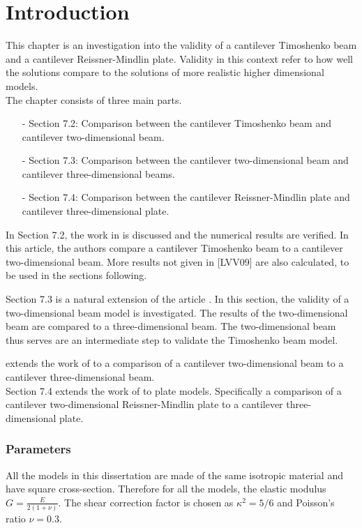 \documentclass[../../main.tex]{subfiles}
\begin{document}
\section{Introduction}
This chapter is an investigation into the validity of a cantilever Timoshenko beam and a cantilever Reissner-Mindlin plate. Validity in this context refer to how well the solutions compare to the solutions of more realistic higher dimensional models.\\

The chapter consists of three main parts.

\begin{itemize}
	\item[-] Section 7.2: Comparison between the cantilever Timoshenko beam and cantilever two-dimensional beam.
	\item[-] Section 7.3: Comparison between the cantilever two-dimensional beam and cantilever three-dimensional beams.
	\item[-] Section 7.4: Comparison between the cantilever Reissner-Mindlin plate and cantilever three-dimensional plate.
\end{itemize}

In Section 7.2, the work in \cite{LVV09} is discussed and the numerical results are verified. In this article, the authors compare a cantilever Timoshenko beam to a cantilever two-dimensional beam. More results not given in  [LVV09] are also calculated, to be used in the sections following.

Section 7.3 is a natural extension of the article \cite{LVV09}. In this section, the validity of a two-dimensional beam model is investigated. The results of the two-dimensional beam are compared to a three-dimensional beam. The two-dimensional beam thus serves are an intermediate step to validate the Timoshenko beam model.

 extends the work of \cite{LVV09} to a comparison of a cantilever two-dimensional beam to a cantilever three-dimensional beam.\\

Section 7.4 extends the work of \cite{LVV09} to plate models. Specifically a comparison of a cantilever two-dimensional Reissner-Mindlin plate to a cantilever three-dimensional plate.\\

\subsubsection{Parameters}
All the models in this dissertation are made of the same isotropic material and have square cross-section. Therefore for all the models, the elastic modulus $\displaystyle G = \frac{E}{2(1+\nu)}$. The shear correction factor is chosen as $\kappa^2 = 5/6$ and Poisson's ratio $\nu = 0.3$.\\
 
 
 
\end{document}
